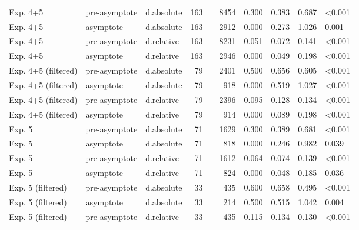 \documentclass[
]{article}
\begin{document}
\begin{table}
{\begin{tabular}[t]{lllrrrrrrl}
\hspace{1em}Exp. 4+5 & pre-asymptote & d.absolute & 163 &  & 8454 & 0.300 & 0.383 & 0.687 & <0.001\\
\hspace{1em}Exp. 4+5 & asymptote & d.absolute & 163 &  & 2912 & 0.000 & 0.273 & 1.026 & 0.001\\
\hspace{1em}Exp. 4+5 & pre-asymptote & d.relative & 163 &  & 8231 & 0.051 & 0.072 & 0.141 & <0.001\\
\hspace{1em}Exp. 4+5 & asymptote & d.relative & 163 &  & 2946 & 0.000 & 0.049 & 0.198 & <0.001\\
\hspace{1em}Exp. 4+5 (filtered) & pre-asymptote & d.absolute & 79 &  & 2401 & 0.500 & 0.656 & 0.605 & <0.001\\
\hspace{1em}Exp. 4+5 (filtered) & asymptote & d.absolute & 79 &  & 918 & 0.000 & 0.519 & 1.027 & <0.001\\
\hspace{1em}Exp. 4+5 (filtered) & pre-asymptote & d.relative & 79 &  & 2396 & 0.095 & 0.128 & 0.134 & <0.001\\
\hspace{1em}Exp. 4+5 (filtered) & asymptote & d.relative & 79 &  & 914 & 0.000 & 0.089 & 0.198 & <0.001\\
\hspace{1em}Exp. 5 & pre-asymptote & d.absolute & 71 &  & 1629 & 0.300 & 0.389 & 0.681 & <0.001\\
\hspace{1em}Exp. 5 & asymptote & d.absolute & 71 &  & 818 & 0.000 & 0.246 & 0.982 & 0.039\\
\hspace{1em}Exp. 5 & pre-asymptote & d.relative & 71 &  & 1612 & 0.064 & 0.074 & 0.139 & <0.001\\
\hspace{1em}Exp. 5 & asymptote & d.relative & 71 &  & 824 & 0.000 & 0.048 & 0.185 & 0.036\\
\hspace{1em}Exp. 5 (filtered) & pre-asymptote & d.absolute & 33 &  & 435 & 0.600 & 0.658 & 0.495 & <0.001\\
\hspace{1em}Exp. 5 (filtered) & asymptote & d.absolute & 33 &  & 214 & 0.500 & 0.515 & 1.042 & 0.004\\
\hspace{1em}Exp. 5 (filtered) & pre-asymptote & d.relative & 33 &  & 435 & 0.115 & 0.134 & 0.130 & <0.001\\

\end{tabular}}
\end{table}
\end{document}
